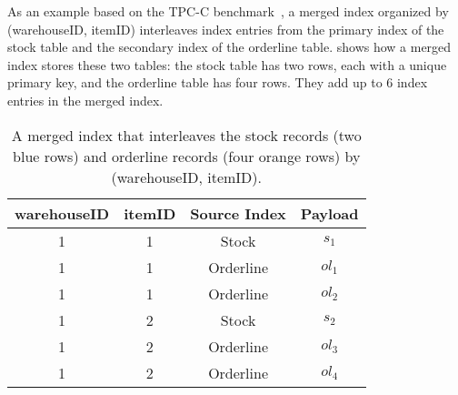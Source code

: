 \documentclass[biblatex, english]{lni}
\newcommand{\stockrow}{
    \rowcolor{blue}
}
\newcommand{\olrow}{
    \rowcolor{orange}
}
\begin{document}
As an example based on the TPC-C benchmark~\cite{tpc2010benchmark}, a merged index organized by (warehouseID, itemID) interleaves index entries from the primary index of the stock table and the secondary index of the orderline table.
 shows how a merged index stores these two tables: the stock table has two rows, each with a unique primary key, and the orderline table has four rows.
They add up to 6 index entries in the merged index.

\begin{table}
    \caption{A merged index that interleaves the stock records (two blue rows) and orderline records (four orange rows) by (warehouseID, itemID).}\label{tab:merged-index}
    \centering
    \begin{tabular}{c c | c | c}
        \hline
        \textbf{warehouseID} & \textbf{itemID} & \textbf{Source Index} & \textbf{Payload} \\
        \hline
        \stockrow
        1 & 1 & Stock & \(s_1\) \\
        \olrow
        1 & 1 & Orderline & \(ol_1\) \\
        \olrow
        1 & 1 & Orderline & \(ol_2\) \\
        \stockrow
        1 & 2 & Stock & \(s_2\) \\
        \olrow
        1 & 2 & Orderline & \(ol_3\) \\
        \olrow
        1 & 2 & Orderline & \(ol_4\) \\
        \hline
    \end{tabular}
\end{table}
\end{document}
